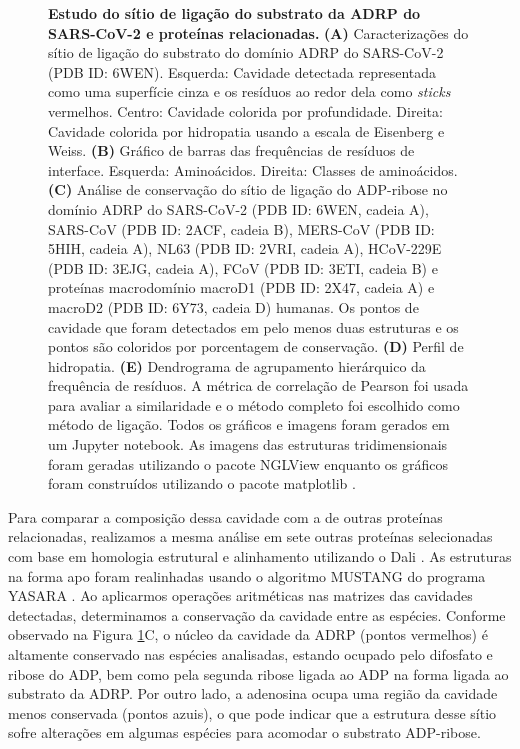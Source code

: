 \documentclass[Portugues]{phdquali}
\begin{document}
\begin{figure}[hp]
  \caption[Estudo do sítio de ligação do substrato da ADRP do SARS-CoV-2 e proteínas relacionadas]{\textbf{Estudo do sítio de ligação do substrato da ADRP do SARS-CoV-2 e proteínas relacionadas.} \textbf{(A)} Caracterizações do sítio de ligação do substrato do domínio ADRP do SARS-CoV-2 (PDB ID: 6WEN). Esquerda: Cavidade detectada representada como uma superfície cinza e os resíduos ao redor dela como \textit{sticks} vermelhos. Centro: Cavidade colorida por profundidade. Direita: Cavidade colorida por hidropatia usando a escala de Eisenberg e Weiss. \textbf{(B)} Gráfico de barras das frequências de resíduos de interface. Esquerda: Aminoácidos. Direita: Classes de aminoácidos. \textbf{(C)} Análise de conservação do sítio de ligação do ADP-ribose no domínio ADRP do SARS-CoV-2 (PDB ID: 6WEN, cadeia A), SARS-CoV (PDB ID: 2ACF, cadeia B), MERS-CoV (PDB ID: 5HIH, cadeia A), NL63 (PDB ID: 2VRI, cadeia A), HCoV-229E (PDB ID: 3EJG, cadeia A), FCoV (PDB ID: 3ETI, cadeia B) e proteínas macrodomínio macroD1 (PDB ID: 2X47, cadeia A) e macroD2 (PDB ID: 6Y73, cadeia D) humanas. Os pontos de cavidade que foram detectados em pelo menos duas estruturas e os pontos são coloridos por porcentagem de conservação. \textbf{(D)} Perfil de hidropatia. \textbf{(E)} Dendrograma de agrupamento hierárquico da frequência de resíduos. A métrica de correlação de Pearson foi usada para avaliar a similaridade e o método completo foi escolhido como método de ligação. Todos os gráficos e imagens foram gerados em um Jupyter notebook. As imagens das estruturas tridimensionais foram geradas utilizando o pacote NGLView \cite{nglview} enquanto os gráficos foram construídos utilizando o pacote matplotlib \cite{matplotlib}.}
  \label{fig:conservation-analysis}
\end{figure}

Para comparar a composição dessa cavidade com a de outras proteínas relacionadas, realizamos a mesma análise em sete outras proteínas selecionadas com base em homologia estrutural e alinhamento utilizando o Dali \cite{dali}. As estruturas na forma apo foram realinhadas usando o algoritmo MUSTANG \cite{mustang} do programa YASARA \cite{yasara}. Ao aplicarmos operações aritméticas nas matrizes das cavidades detectadas, determinamos a conservação da cavidade entre as espécies. Conforme observado na Figura \ref{fig:conservation-analysis}C, o núcleo da cavidade da ADRP (pontos vermelhos) é altamente conservado nas espécies analisadas, estando ocupado pelo difosfato e ribose do ADP, bem como pela segunda ribose ligada ao ADP na forma ligada ao substrato da ADRP. Por outro lado, a adenosina ocupa uma região da cavidade menos conservada (pontos azuis), o que pode indicar que a estrutura desse sítio sofre alterações em algumas espécies para acomodar o substrato ADP-ribose.
\end{document}
